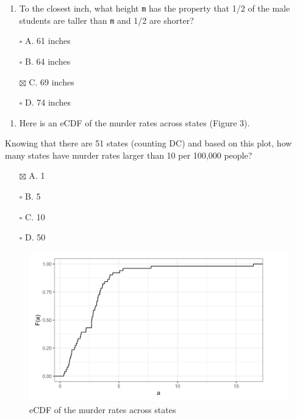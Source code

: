 \documentclass[
]{article}
\providecommand{\tightlist}{%
  \setlength{\itemsep}{0pt}\setlength{\parskip}{0pt}}
\begin{document}
\begin{enumerate}
\def\labelenumi{\arabic{enumi}.}
\setcounter{enumi}{3}
\tightlist
\item
  To the closest inch, what height \texttt{m} has the property that 1/2
  of the male students are taller than \texttt{m} and 1/2 are shorter?
\end{enumerate}

\begin{itemize}
\tightlist
\item[$\square$]
  A. 61 inches
\item[$\square$]
  B. 64 inches
\item[$\boxtimes$]
  C. 69 inches
\item[$\square$]
  D. 74 inches
\end{itemize}

\begin{enumerate}
\def\labelenumi{\arabic{enumi}.}
\setcounter{enumi}{4}
\tightlist
\item
  Here is an eCDF of the murder rates across states (Figure 3).
\end{enumerate}

Knowing that there are 51 states (counting DC) and based on this plot,
how many states have murder rates larger than 10 per 100,000 people?

\begin{itemize}
\tightlist
\item[$\boxtimes$]
  A. 1
\item[$\square$]
  B. 5
\item[$\square$]
  C. 10
\item[$\square$]
  D. 50
\end{itemize}

\begin{figure}
\centering
\includegraphics{images/eCDF murder rates across states.png}
\caption{eCDF of the murder rates across states}
\end{figure}
\end{document}
